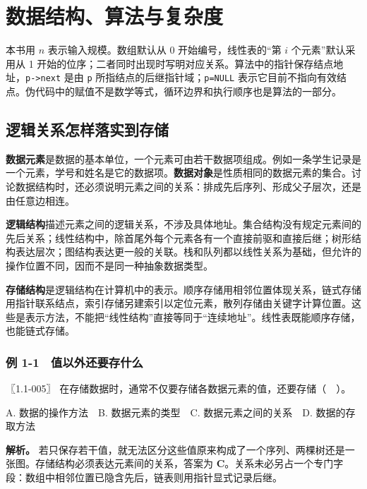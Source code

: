 \chapter{数据结构、算法与复杂度}\label{ds-ch1}

本书用 \(n\) 表示输入规模。数组默认从 0 开始编号，线性表的``第 \(i\) 个元素''默认采用从 1 开始的位序；二者同时出现时写明对应关系。算法中的指针保存结点地址，\allowbreak{}\texttt{p-\textgreater{}next} 是由 \allowbreak{}\texttt{p} 所指结点的后继指针域；\allowbreak{}\texttt{p=NULL} 表示它目前不指向有效结点。伪代码中的赋值不是数学等式，循环边界和执行顺序也是算法的一部分。

\section{逻辑关系怎样落实到存储}\label{ds-01-01}

\textbf{数据元素}是数据的基本单位，一个元素可由若干数据项组成。例如一条学生记录是一个元素，学号和姓名是它的数据项。\textbf{数据对象}是性质相同的数据元素的集合。讨论数据结构时，还必须说明元素之间的关系：排成先后序列、形成父子层次，还是由任意边相连。

\textbf{逻辑结构}描述元素之间的逻辑关系，不涉及具体地址。集合结构没有规定元素间的先后关系；线性结构中，除首尾外每个元素各有一个直接前驱和直接后继；树形结构表达层次；图结构表达更一般的关联。栈和队列都以线性关系为基础，但允许的操作位置不同，因而不是同一种抽象数据类型。

\textbf{存储结构}是逻辑结构在计算机中的表示。顺序存储用相邻位置体现关系，链式存储用指针联系结点，索引存储另建索引以定位元素，散列存储由关键字计算位置。这些是表示方法，不能把``线性结构''直接等同于``连续地址''。线性表既能顺序存储，也能链式存储。

\subsection{例 1-1　值以外还要存什么}\label{ds-ex1-1}

\noindent{}〖1.1-005〗 在存储数据时，通常不仅要存储各数据元素的值，还要存储（　）。

A. 数据的操作方法　B. 数据元素的类型　C. 数据元素之间的关系　D. 数据的存取方法


\textbf{解析。} 若只保存若干值，就无法区分这些值原来构成了一个序列、两棵树还是一张图。存储结构必须表达元素间的关系，答案为 \textbf{C}。关系未必另占一个专门字段：数组中相邻位置已隐含先后，链表则用指针显式记录后继。

